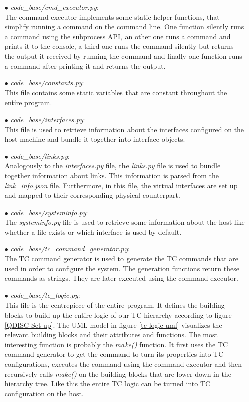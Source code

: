 \begin{enumerate}
\item[$\bullet$]\textit{code\_base/cmd\_executor.py}:
\\
The command executor implements some static helper functions, that simplify running a command on the command line. One function silently runs a command using the subprocess \acs{API}, an other one runs a command and prints it to the console, a third one runs the command silently but returns the output it received by running the command and finally one function runs a command after printing it and returns the output.

\item[$\bullet$]\textit{code\_base/constants.py}:
\\
This file contains some static variables that are constant throughout the entire program. 

\item[$\bullet$]\textit{code\_base/interfaces.py}:
\\
This file is used to retrieve information about the interfaces configured on the host machine and bundle it together into interface objects.

\item[$\bullet$]\textit{code\_base/links.py}:
\\
Analogously to the \textit{interfaces.py} file, the \textit{links.py} file is used to bundle together information about links. This information is parsed from the \textit{link\_info.json} file. Furthermore, in this file, the virtual interfaces are set up and mapped to their corresponding physical counterpart.

\item[$\bullet$]\textit{code\_base/systeminfo.py}:
\\
The \textit{systeminfo.py} file is used to retrieve some information about the host like whether a file exists or which interface is used by default.

\item[$\bullet$]\textit{code\_base/tc\_command\_generator.py}:
\\
The \acs{TC} command generator is used to generate the \acs{TC} commands that are used in order to configure the system. The generation functions return these commands as strings. They are later executed using the command executor.

\item[$\bullet$]\textit{code\_base/tc\_logic.py}:
\\
This file is the centrepiece of the entire program. It defines the building blocks to build up the entire logic of our \acs{TC} hierarchy according to figure \ref{QDISC-Set-up}. The \ac{UML}-model in figure \ref{tc logic uml} visualizes the relevant building blocks and their attributes and functions. The most interesting function is probably the \textit{make()} function. It first uses the \acs{TC} command generator to get the command to turn its properties into \acs{TC} configurations, executes the command using the command executor and then recursively calls \textit{make()} on the building blocks that are lower down in the hierarchy tree. Like this the entire \acs{TC} logic can be turned into \acs{TC} configuration on the host. 


\end{enumerate}
